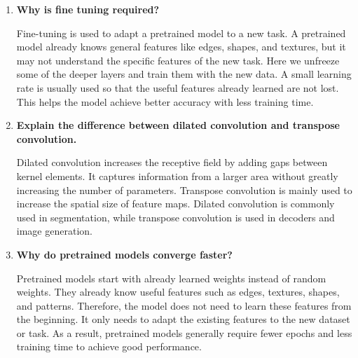 \documentclass[11pt]{article}
\begin{document}
\begin{enumerate}[leftmargin=*]
    \vspace{3mm}
    
    \item \textbf{Why is fine tuning required?}
    
    \vspace{5mm}
    
    Fine-tuning is used to adapt a pretrained model to a new task.
    A pretrained model already knows general features like edges, shapes, and textures, but it may not understand the specific features of the new task.
    Here we unfreeze some of the deeper layers and train them with the new data.
    A small learning rate is usually used so that the useful features already learned are not lost.
    This helps the model achieve better accuracy with less training time.
    
    \vspace{3mm}
    
    \item \textbf{Explain the difference between dilated convolution and transpose convolution.}
    
    \vspace{5mm}
    
    Dilated convolution increases the receptive field by adding gaps between kernel elements.
    It captures information from a larger area without greatly increasing the number of parameters.
    Transpose convolution is mainly used to increase the spatial size of feature maps.
    Dilated convolution is commonly used in segmentation, while transpose convolution is used in decoders and image generation.
    
    \vspace{3mm}
    
    \item \textbf{Why do pretrained models converge faster?}
    
    \vspace{5mm}
    
    Pretrained models start with already learned weights instead of random weights.
    They already know useful features such as edges, textures, shapes, and patterns.
    Therefore, the model does not need to learn these features from the beginning.
    It only needs to adapt the existing features to the new dataset or task.
    As a result, pretrained models generally require fewer epochs and less training time to achieve good performance.
    
    \vspace{3mm}
    

\end{enumerate}
\end{document}
